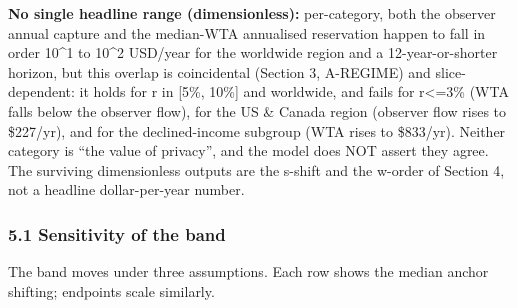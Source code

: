 \documentclass[
  11pt,
]{article}
\begin{document}
\textbf{No single headline range (dimensionless):} per-category, both
the observer annual capture and the median-WTA annualised reservation
happen to fall in order 10\^{}1 to 10\^{}2 USD/year for the worldwide
region and a 12-year-or-shorter horizon, but this overlap is
coincidental (Section 3, A-REGIME) and slice-dependent: it holds for r
in {[}5\%, 10\%{]} and worldwide, and fails for r\textless=3\% (WTA
falls below the observer flow), for the US \& Canada region (observer
flow rises to \$227/yr), and for the declined-income subgroup (WTA rises
to \$833/yr). Neither category is ``the value of privacy'', and the
model does NOT assert they agree. The surviving dimensionless outputs
are the s-shift and the w-order of Section 4, not a headline
dollar-per-year number.

\subsubsection{5.1 Sensitivity of the
band}\label{sensitivity-of-the-band}

The band moves under three assumptions. Each row shows the median anchor
shifting; endpoints scale similarly.
\end{document}
